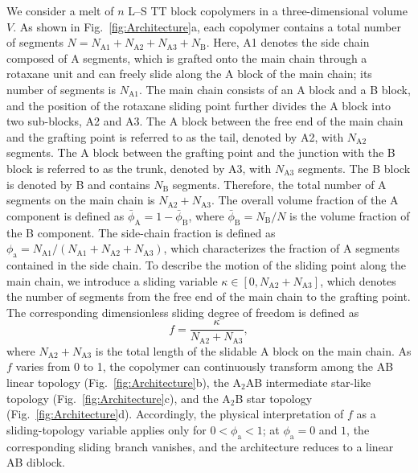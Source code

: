     We consider a melt of $n$ L--S TT block copolymers in a three-dimensional volume $V$.
    As shown in Fig.~\ref{fig:Architecture}a, each copolymer contains a total number of segments
    $N = N_{\mathrm{A1}} + N_{\mathrm{A2}} + N_{\mathrm{A3}} + N_{\mathrm{B}}$.
    Here, A1 denotes the side chain composed of A segments, which is grafted onto the main chain through a rotaxane unit and can freely slide along the A block of the main chain; its number of segments is $N_{\mathrm{A1}}$.
    The main chain consists of an A block and a B block, and the position of the rotaxane sliding point further divides the A block into two sub-blocks, A2 and A3.
    The A block between the free end of the main chain and the grafting point is referred to as the tail, denoted by A2, with $N_{\mathrm{A2}}$ segments.
    The A block between the grafting point and the junction with the B block is referred to as the trunk, denoted by A3, with $N_{\mathrm{A3}}$ segments.
    The B block is denoted by B and contains $N_{\mathrm{B}}$ segments.
    Therefore, the total number of A segments on the main chain is $N_{\mathrm{A2}} + N_{\mathrm{A3}}$.
    The overall volume fraction of the A component is defined as
    $\bar{\phi}_{\mathrm{A}} = 1 - \bar{\phi}_{\mathrm{B}}$, where
    $\bar{\phi}_{\mathrm{B}} = N_{\mathrm{B}}/N$ is the volume fraction of the B component.
    The side-chain fraction is defined as
    $\phi_{\mathrm a} = N_{\mathrm{A1}}/(N_{\mathrm{A1}} + N_{\mathrm{A2}} + N_{\mathrm{A3}})$,
    which characterizes the fraction of A segments contained in the side chain.
    To describe the motion of the sliding point along the main chain, we introduce a sliding variable $\kappa \in [0, N_{\mathrm{A2}} + N_{\mathrm{A3}}]$, which denotes the number of segments from the free end of the main chain to the grafting point.
    The corresponding dimensionless sliding degree of freedom is defined as
    \begin{equation}
        f = \frac{\kappa}{N_{\mathrm{A2}} + N_{\mathrm{A3}}},
    \end{equation}
    where $N_{\mathrm{A2}} + N_{\mathrm{A3}}$ is the total length of the slidable A block on the main chain.
    As $f$ varies from 0 to 1, the copolymer can continuously transform among the AB linear topology (Fig.~\ref{fig:Architecture}b), the A$_2$AB intermediate star-like topology (Fig.~\ref{fig:Architecture}c), and the A$_2$B star topology (Fig.~\ref{fig:Architecture}d).
    Accordingly, the physical interpretation of $f$ as a sliding-topology variable applies only for $0<\phi_{\mathrm a}<1$; at $\phi_{\mathrm a}=0$ and $1$, the corresponding sliding branch vanishes, and the architecture reduces to a linear AB diblock.
    

